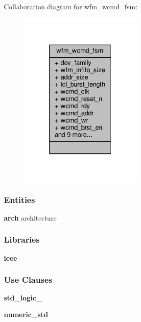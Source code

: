 Collaboration diagram for wfm\+\_\+wcmd\+\_\+fsm\+:\nopagebreak
\begin{figure}[H]
\begin{center}
\leavevmode
\includegraphics[width=174pt]{d7/d8f/classwfm__wcmd__fsm__coll__graph}
\end{center}
\end{figure}
\subsubsection*{Entities}
\begin{DoxyCompactItemize}
\item 
{\bf arch} architecture
\end{DoxyCompactItemize}
\subsubsection*{Libraries}
 \begin{DoxyCompactItemize}
\item 
{\bf ieee} 
\end{DoxyCompactItemize}
\subsubsection*{Use Clauses}
 \begin{DoxyCompactItemize}
\item 
{\bf std\+\_\+logic\+\_}   
\item 
{\bf numeric\+\_\+std}   
\end{DoxyCompactItemize}
